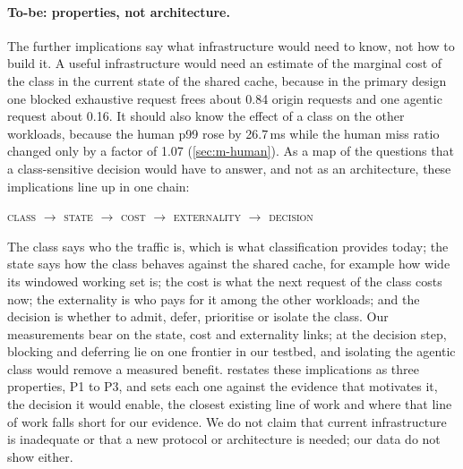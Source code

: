 \paragraph{To-be: properties, not architecture.}
The further implications say what infrastructure would need to know, not how to build
it.
A useful infrastructure would need an estimate of the marginal cost of the class in the
current state of the shared cache, because in the primary design one blocked exhaustive
request frees about 0.84 origin requests and one agentic request about
0.16.
It should also know the effect of a class on the other workloads, because the human p99
rose by 26.7\,ms while the human miss ratio changed only by a factor of 1.07
(\cref{sec:m-human}).
As a map of the questions that a class-sensitive decision would have to answer, and not as
an architecture, these implications line up in one chain:
\begin{center}\small
\textsc{class} $\rightarrow$ \textsc{state} $\rightarrow$ \textsc{cost} $\rightarrow$
\textsc{externality} $\rightarrow$ \textsc{decision}
\end{center}
The class says who the traffic is, which is what classification provides today; the state
says how the class behaves against the shared cache, for example how wide its windowed
working set is; the cost is what the next request of the class costs now; the externality
is who pays for it among the other workloads; and the decision is whether to admit, defer,
prioritise or isolate the class.
Our measurements bear on the state, cost and externality links; at the decision step,
blocking and deferring lie on one frontier in our testbed, and isolating the agentic class
would remove a measured benefit.
 restates these implications as three properties, P1 to P3, and sets
each one against the evidence that motivates it, the decision it would enable, the closest
existing line of work and where that line of work falls short for our evidence.
We do not claim that current infrastructure is inadequate or that a new protocol or
architecture is needed; our data do not show either.

